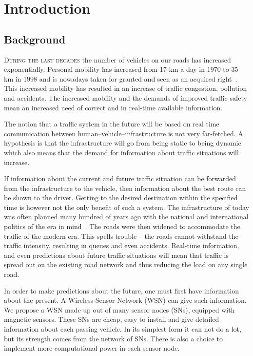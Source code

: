 \cleardoublepage\chapter{Introduction}\label{chap:introduction}
\setcounter{page}{1}
\pagestyle{fancy}
\section{Background}
\textsc{During the last decades} the number of vehicles on our roads has increased exponentially. Personal mobility has increased from 17 km a day in 1970 to 35 km in 1998 and is nowadays taken for granted and seen as an acquired right~\cite{whitebook}. This increased mobility has resulted in an increase of traffic congestion, pollution and accidents. The increased mobility and the demands of improved traffic safety mean an increased need of correct and in real-time available information.

The notion that a traffic system in the future will be based on real time communication between human--vehicle--infrastructure is not very far-fetched. A hypothesis is that the infrastructure will go from being static to being dynamic~\cite{amparo} which also means that the demand for information about traffic situations will increase. %

If information about the current and future traffic situation can be forwarded from the infrastructure to the vehicle, then information about the best route can be shown to the driver. Getting to the desired destination within the specified time is however not the only benefit of such a system. The infrastructure of today was often planned many hundred of years ago with the national and international politics of the era in mind~\cite{whitebook}. The roads were then widened to accommodate the traffic of the modern era. This spells trouble -- the roads cannot withstand the traffic intensity, resulting in queues and even accidents. Real-time information, and even predictions about future traffic situations will mean that traffic is spread out on the existing road network and thus reducing the load on any single road. 

In order to make predictions about the future, one must first have information about the present. A Wireless Sensor Network (WSN) can give such information. We propose a WSN made up out of many sensor nodes (SNs), equipped with magnetic sensors. These SNs are cheap, easy to install and give detailed information about each passing vehicle. In its simplest form it can not do a lot, but its strength comes from the network of SNs. There is also a choice to implement more computational power in each sensor node.

